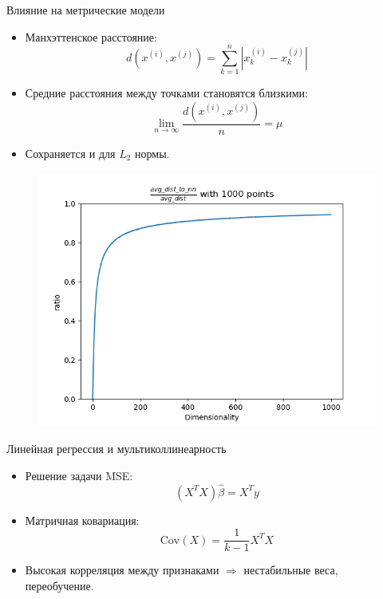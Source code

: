\begin{frame}[allowframebreaks]{Влияние на метрические модели}
    \begin{itemize}
        \item Манхэттенское расстояние:
              \begin{equation*}
                  d(x^{(i)}, x^{(j)}) = \sum_{k=1}^n |x_k^{(i)} - x_k^{(j)}|
              \end{equation*}
        \item Средние расстояния между точками становятся близкими:
              \begin{equation*}
                  \lim_{n\to\infty}\frac{d(x^{(i)}, x^{(j)})}{n} = \mu
              \end{equation*}
        \item Сохраняется и для $L_2$ нормы.
    \end{itemize}
    
    \begin{figure}
        \centering
        \includegraphics[width=.7\textwidth]{../resources/motivation/ratio.png}
    \end{figure}
\end{frame}

\begin{frame}{Линейная регрессия и мультиколлинеарность}
    \begin{itemize}
        \item Решение задачи MSE:
              \begin{equation*}
                  (X^TX)\hat{\beta} = X^Ty
              \end{equation*}
        \item Матричная ковариация:
              \begin{equation*}
                  \mathrm{Cov}(X) = \frac{1}{k-1}X^TX
              \end{equation*}
        \item Высокая корреляция между признаками \(\Rightarrow\) нестабильные веса, переобучение.
    \end{itemize}
\end{frame}

